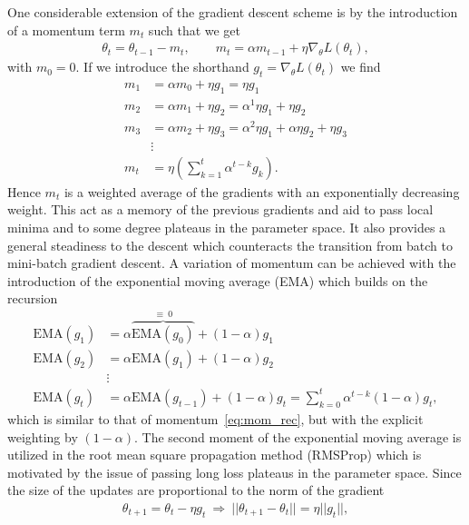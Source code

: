 One considerable extension of the gradient descent scheme is by the introduction of a momentum term $m_t$ such that we get
\begin{align}
  \theta_t = \theta_{t-1} - m_t, \qquad m_t = \alpha m_{t-1} + \eta \nabla_\theta L(\theta_t),
  \label{eq:mom}
\end{align}
with $m_0 = 0$. If we introduce the shorthand $g_t = \nabla_\theta L(\theta_t)$ we find
\begin{align}
  m_1 &= \alpha m_0 + \eta g_1 = \eta g_1 \nonumber \\
  m_2 &= \alpha m_1 + \eta g_2 = \alpha^1 \eta g_1 + \eta g_2 \nonumber \\
  m_3 &= \alpha m_2 + \eta g_3 = \alpha^2 \eta g_1 + \alpha\eta g_2 + \eta g_3 \nonumber \\
  &\vdots \nonumber \\
  m_t &= \eta \left(\sum_{k=1}^{t} \alpha^{t-k}g_k\right).
  \label{eq:mom_rec}
\end{align}
Hence $m_t$ is a weighted average of the gradients with an exponentially decreasing weight. This act as a memory of the previous gradients and aid to pass local minima and to some degree plateaus in the parameter space. It also provides a general steadiness to the descent which counteracts the transition from batch to mini-batch gradient descent. A variation of momentum can be achieved with the introduction of the exponential moving average (EMA) which builds on the recursion
\begin{align*}
    \text{EMA}(g_1) &= \alpha \overbrace{\text{EMA}(g_0)}^{\equiv \ 0} + (1-\alpha)g_1 \\
    \text{EMA}(g_2) &= \alpha \text{EMA}(g_1) + (1-\alpha)g_2 \\
    &\vdots \\
    \text{EMA}(g_t) &= \alpha \text{EMA}(g_{t-1}) + (1-\alpha)g_t  = \sum_{k=0}^t \alpha^{t-k}(1-\alpha)g_t,
\end{align*}
which is similar to that of momentum~\cref{eq:mom_rec}, but with the explicit weighting by $(1-\alpha)$. The second moment of the exponential moving average is utilized in the root mean square propagation method (\acrshort{RMSProp}) which is motivated by the issue of passing long loss plateaus in the parameter space. Since the size of the updates are proportional to the norm of the gradient
\begin{align*}
  \theta_{t+1} = \theta_t - \eta g_t \ \Longrightarrow \ ||\theta_{t+1}-\theta_{t}|| = \eta ||g_t||,
\end{align*}
